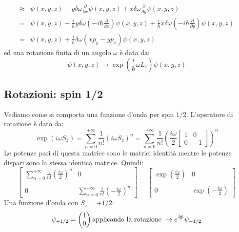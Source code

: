 \begin{align*}
\approx & \psi(x, y, z) - y\delta\omega \frac{\partial}{\partial x}\psi(x, y, z) + x\delta\omega \frac{\partial}{\partial y}\psi(x, y, z) \\
= & \psi(x, y, z) - \frac{i}{\hbar} y\delta\omega \left(-i\hbar \frac{\partial}{\partial x}\right)\psi(x, y, z) + \frac{i}{\hbar} x\delta\omega \left(-i\hbar \frac{\partial}{\partial y}\right)\psi(x, y, z) \\
= & \psi(x, y, z) + \frac{i}{\hbar}\delta\omega(xp_y-yp_x)\psi(x, y, z)
\end{align*}
ed una rotazione finita di un angolo $\omega$ è data da:
\begin{equation*}
    \psi(x, y, z)\to\exp{\left(\frac{i}{\hbar}\omega L_z\right)}\psi(x, y, z)
\end{equation*}
\subsection{Rotazioni: spin 1/2}
Vediamo come si comporta una funzione d'onda per spin $1/2$. L'operatore di rotazione è dato da:
\begin{equation*}
    \exp{\left(i\omega S_z\right)}=\sum_{n=0}^{+\infty}\frac{1}{n!}(i\omega S_z)^n=\sum_{n=0}^{+\infty}\frac{1}{n!}\left(\frac{i\omega}{2} \begin{bmatrix}1&0\\0&-1\end{bmatrix}\right)^n
\end{equation*}
Le potenze pari di questa matrice sono le matrici identità mentre le potenze dispari sono la stessa identica matrice. Quindi:
\begin{equation*}
    \begin{bmatrix} \sum_{n=0}^{+\infty}\frac{1}{n!}(\frac{i\omega}{2})^n & 0 \\ 
 &  \\ 0 & 
\sum_{n=0}^{+\infty}\frac{1}{n!}(-\frac{i\omega}{2})^n\end{bmatrix} = \begin{bmatrix} \exp{\left(\frac{i\omega}{2}\right)} & 0 \\ 
 &  \\ 0 & 
\exp{\left(-\frac{i\omega}{2}\right)}\end{bmatrix}
\end{equation*}
Una funzione d'onda con $S_z=+1/2$:
\begin{equation*}
    \psi_{+1/2}=\left(\begin{array}{@{}c@{}}
1 \\
0
\end{array}\right) \text{applicando la rotazione } \to e^{\frac{i\omega}{2}} \psi_{+1/2}
\end{equation*}
